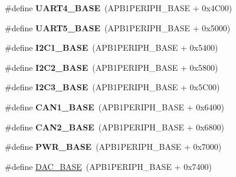 \begin{DoxyCompactItemize}
\#define {\bfseries U\+A\+R\+T4\+\_\+\+B\+A\+SE}~(A\+P\+B1\+P\+E\+R\+I\+P\+H\+\_\+\+B\+A\+SE + 0x4\+C00)
\item 
\mbox{\label{group___peripheral__memory__map_gaa155689c0e206e6994951dc3cf31052a}} 
\#define {\bfseries U\+A\+R\+T5\+\_\+\+B\+A\+SE}~(A\+P\+B1\+P\+E\+R\+I\+P\+H\+\_\+\+B\+A\+SE + 0x5000)
\item 
\mbox{\label{group___peripheral__memory__map_gacd72dbffb1738ca87c838545c4eb85a3}} 
\#define {\bfseries I2\+C1\+\_\+\+B\+A\+SE}~(A\+P\+B1\+P\+E\+R\+I\+P\+H\+\_\+\+B\+A\+SE + 0x5400)
\item 
\mbox{\label{group___peripheral__memory__map_ga04bda70f25c795fb79f163b633ad4a5d}} 
\#define {\bfseries I2\+C2\+\_\+\+B\+A\+SE}~(A\+P\+B1\+P\+E\+R\+I\+P\+H\+\_\+\+B\+A\+SE + 0x5800)
\item 
\mbox{\label{group___peripheral__memory__map_ga4e8b9198748235a1729e1e8f8f24983b}} 
\#define {\bfseries I2\+C3\+\_\+\+B\+A\+SE}~(A\+P\+B1\+P\+E\+R\+I\+P\+H\+\_\+\+B\+A\+SE + 0x5\+C00)
\item 
\mbox{\label{group___peripheral__memory__map_gad8e45ea6c032d9fce1b0516fff9d8eaa}} 
\#define {\bfseries C\+A\+N1\+\_\+\+B\+A\+SE}~(A\+P\+B1\+P\+E\+R\+I\+P\+H\+\_\+\+B\+A\+SE + 0x6400)
\item 
\mbox{\label{group___peripheral__memory__map_gaf7b8267b0d439f8f3e82f86be4b9fba1}} 
\#define {\bfseries C\+A\+N2\+\_\+\+B\+A\+SE}~(A\+P\+B1\+P\+E\+R\+I\+P\+H\+\_\+\+B\+A\+SE + 0x6800)
\item 
\mbox{\label{group___peripheral__memory__map_gac691ec23dace8b7a649a25acb110217a}} 
\#define {\bfseries P\+W\+R\+\_\+\+B\+A\+SE}~(A\+P\+B1\+P\+E\+R\+I\+P\+H\+\_\+\+B\+A\+SE + 0x7000)
\item 
\#define \hyperlink{group___peripheral__memory__map_gad18d0b914c7f68cecbee1a2d23a67d38}{D\+A\+C\+\_\+\+B\+A\+SE}~(A\+P\+B1\+P\+E\+R\+I\+P\+H\+\_\+\+B\+A\+SE + 0x7400)
\item 
\mbox{\label{group___peripheral__memory__map_gaf8aa324ca5011b8173ab16585ed7324a}} 

\end{DoxyCompactItemize}
